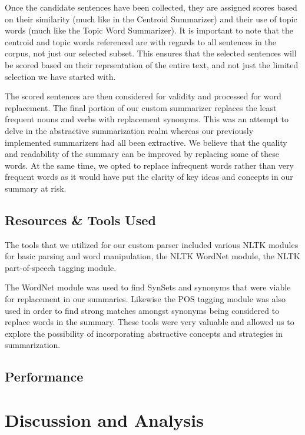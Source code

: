 \documentclass[11pt,letterpaper]{article}
\begin{document}
Once the candidate sentences have been collected, they are assigned scores based on their similarity (much like in the Centroid Summarizer) and their use of topic words (much like the Topic Word Summarizer). It is important to note that the centroid and topic words referenced are with regards to all sentences in the corpus, not just our selected subset. This ensures that the selected sentences will be scored based on their reprsentation of the entire text, and not just the limited selection we have started with.

The scored sentences are then considered for validity and processed for word replacement. The final portion of our custom summarizer replaces the least frequent nouns and verbs with replacement synonyms. This was an attempt to delve in the abstractive summarization realm whereas our previously implemented summarizers had all been extractive. We believe that the quality and readability of the summary can be improved by replacing some of these words. At the same time, we opted to replace infrequent words rather than very frequent words as it would have put the clarity of key ideas and concepts in our summary at risk.

\subsection{Resources \& Tools Used}
The tools that we utilized for our custom parser included various NLTK modules for basic parsing and word manipulation, the NLTK WordNet module, the NLTK part-of-speech tagging module.

The WordNet module was used to find SynSets and synonyms that were viable for replacement in our summaries. Likewise the POS tagging module was also used in order to find strong matches amongst synonyms being considered to replace words in the summary. These tools were very valuable and allowed us to explore the possibility of incorporating abstractive concepts and strategies in summarization.

\subsection{Performance}

\section{Discussion and Analysis}
\end{document}
